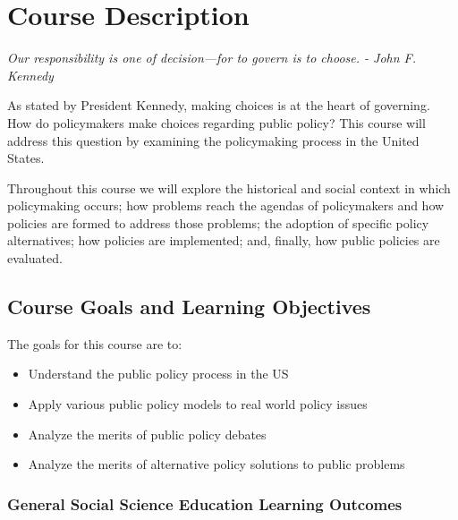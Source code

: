 \hypertarget{course-description}{%
\section{Course Description}\label{course-description}}

\emph{Our responsibility is one of decision---for to govern is to
choose. - John F. Kennedy}

\vspace{0.15in}

\noindent As stated by President Kennedy, making choices is at the heart
of governing. How do policymakers make choices regarding public policy?
This course will address this question by examining the policymaking
process in the United States.

\vspace{0.1in}

\noindent Throughout this course we will explore the historical and
social context in which policymaking occurs; how problems reach the
agendas of policymakers and how policies are formed to address those
problems; the adoption of specific policy alternatives; how policies are
implemented; and, finally, how public policies are evaluated.

\hypertarget{course-goals-and-learning-objectives}{%
\subsection{Course Goals and Learning
Objectives}\label{course-goals-and-learning-objectives}}

The goals for this course are to:

\begin{itemize}

\item
  Understand the public policy process in the US
\item
  Apply various public policy models to real world policy issues
\item
  Analyze the merits of public policy debates
\item
  Analyze the merits of alternative policy solutions to public problems
\end{itemize}

\hypertarget{general-social-science-education-learning-outcomes}{%
\subsubsection{General Social Science Education Learning
Outcomes}\label{general-social-science-education-learning-outcomes}}

